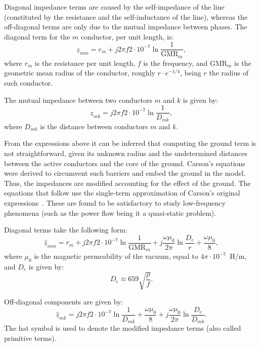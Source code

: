 \documentclass[11pt]{article}
\begin{document}
	Diagonal impedance terms are caused by the self-impedance of the line (constituted by the resistance and the self-inductance of the line), whereas the off-diagonal terms are only due to the mutual impedance between phases. The diagonal term for the $m$ conductor, per unit length, is:
	\begin{equation}
			\underline{z}_{mm} = r_m + j 2\pi f 2\cdot 10^{-7} \ln \frac{1}{\text{GMR}_m}, 
	\end{equation}
	where $r_m$ is the resistance per unit length, $f$ is the frequency, and $\text{GMR}_m$ is the geometric mean radius of the conductor, roughly $r\cdot e^{-1/4}$, being $r$ the radius of such conductor. 
	
	The mutual impedance between two conductors $m$ and $k$ is given by:
	\begin{equation}
		\underline{z}_{mk} = j 2\pi f 2\cdot 10^{-7} \ln \frac{1}{D_{mk}},
	\end{equation}
	where $D_{mk}$ is the distance between conductors $m$ and $k$. 

	From the expressions above it can be inferred that computing the ground term is not straightforward, given its unknown radius and the undetermined distances between the active conductors and the core of the ground. Carson's equations were derived to circumvent such barriers and embed the ground in the model. Thus, the impedances are modified accounting for the effect of the ground. The equations that follow use the single-term approximation of Carson's original expressions~\cite{krolo2018computation}. These are found to be satisfactory to study low-frequency phenomena (such as the power flow being it a quasi-static problem). 
	
	Diagonal terms take the following form:
		\begin{equation}
			\underline{\hat{z}}_{mm} = r_m + j 2\pi f 2\cdot 10^{-7} \ln \frac{1}{\text{GMR}_m} + j\frac{\omega \mu_0}{2\pi}\ln \frac{D_e}{r} + \frac{\omega \mu_0}{8}, 
	\end{equation}
	where $\mu_0$ is the magnetic permeability of the vacuum, equal to $4\pi \cdot 10^{-7}$~H/m, and $D_e$ is given by:
	\begin{equation}
		D_e \approx 659 \sqrt{\frac{\rho}{f}}.
	\end{equation}

	Off-diagonal components are given by:	
	\begin{equation}
		\underline{\hat{z}}_{mk} = j 2\pi f 2\cdot 10^{-7} \ln \frac{1}{D_{mk}} + \frac{\omega \mu_0}{8} + j \frac{\omega \mu_0}{2\pi} \ln \frac{D_e}{D_{mk}}.
	\end{equation}
	The hat symbol is used to denote the modified impedance terms (also called primitive terms).
\end{document}
